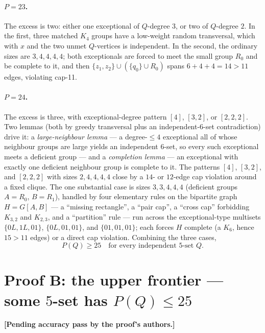 \documentclass[11pt,reqno]{amsart}
\theoremstyle{definition}
\theoremstyle{remark}
\newcommand{\capeleven}{\textsf{cap-11}}
\newcommand{\pendingB}{%
  \par\nobreak\smallskip\noindent
  \textbf{[Pending accuracy pass by the proof's authors.]}\par\smallskip}
\begin{document}
\paragraph{$P=23$.} The excess is two: either one exceptional of $Q$-degree $3$, or two of
$Q$-degree $2$. In the first, three matched $K_4$ groups have a low-weight random
transversal, which with $x$ and the two unmet $Q$-vertices is independent. In the second,
the ordinary sizes are $3,4,4,4,4$; both exceptionals are forced to meet the small group
$R_0$ and be complete to it, and then $\{z_1,z_2\}\cup(\{q_0\}\cup R_0)$ spans
$6+4+4=14>11$ edges, violating \capeleven.

\paragraph{$P=24$.} The excess is three, with exceptional-degree pattern $[4]$, $[3,2]$,
or $[2,2,2]$. Two lemmas (both by greedy transversal plus an independent-$6$-set
contradiction) drive it: a \emph{large-neighbour lemma} --- a degree-$\le 4$ exceptional
all of whose neighbour groups are large yields an independent $6$-set, so every such
exceptional meets a deficient group --- and a \emph{completion lemma} --- an exceptional
with exactly one deficient neighbour group is complete to it. The patterns $[4]$, $[3,2]$,
and $[2,2,2]$ with sizes $2,4,4,4,4$ close by a $14$- or $12$-edge cap violation around a
fixed clique. The one substantial case is sizes $3,3,4,4,4$ (deficient groups $A=R_0$,
$B=R_1$), handled by four elementary rules on the bipartite graph $H=G[A,B]$ --- a
``missing rectangle'', a ``pair cap'', a ``cross cap'' forbidding $K_{3,2}$ and $K_{2,3}$,
and a ``partition'' rule --- run across the exceptional-type multisets $\{0L,1L,01\}$,
$\{0L,01,01\}$, and $\{01,01,01\}$; each forces $H$ complete (a $K_6$, hence $15>11$
edges) or a direct cap violation. Combining the three cases,
\begin{equation}
  P(Q)\ge 25\quad\text{for every independent $5$-set }Q. \tag{L}
\end{equation}

\section{Proof B: the upper frontier --- some \texorpdfstring{$5$-set has $P(Q)\le 25$}{5-set has P(Q)<=25}}\label{sec:B-upper}
\pendingB
\end{document}
